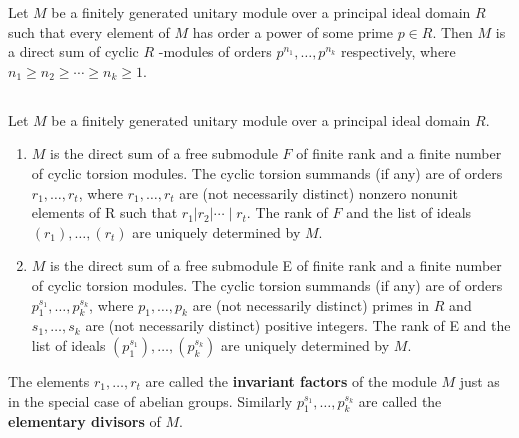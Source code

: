 \begin{theorem}
    Let $M$ be a finitely generated unitary module over a principal ideal domain $R$ such that every element of $M$ has order a power of some prime $p\in R$.
    Then $M$ is a direct sum of cyclic $R$ -modules of orders $p^{n_1}, \ldots, p^{n_k}$ respectively, where $n_1 \geq n_2 \geq \cdots \geq n_k \geq 1$.
\end{theorem}

\subsection{}
\begin{theorem}
    Let $M$ be a finitely generated unitary module over a principal ideal domain $R$.
    \begin{enumerate}
        \item
              $M$ is the direct sum of a free  submodule $F$ of finite rank and a finite number of cyclic torsion modules.
              The cyclic torsion summands (if any) are of orders $r_1, \ldots, r_{t}$, where $r_1, \ldots, r_{t}$ are (not necessarily distinct) nonzero nonunit elements of R such that $r_1\left|r_2\right| \cdots \mid r_{t}$.
              The rank of $F$ and the list of ideals $\left(r_1\right), \ldots,\left(r_{t}\right)$ are uniquely determined by $M$.
        \item
              $M$ is the direct sum of a free submodule E of finite rank and a finite number of cyclic torsion modules. The cyclic torsion summands (if any) are of orders $p_1^{s_1}, \ldots, p_k^{s_k}$, where $p_1, \ldots, p_k$ are (not necessarily distinct) primes in $R$ and $s_1, \ldots, s_k$ are (not necessarily distinct) positive integers. The rank of E and the list of ideals $\left(p_1^{s_1}\right), \ldots,\left(p_k^{s_k}\right)$ are uniquely determined by $M$.
    \end{enumerate}
    The elements $r_1, \ldots, r_t$ are called the \textbf{invariant factors} of the module $M$ just as in the special case of abelian groups. Similarly $p_1^{s_1}, \ldots, p_k^{s_k}$ are called the \textbf{elementary divisors} of $M$.
\end{theorem}

